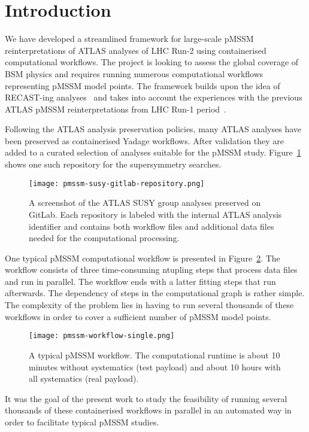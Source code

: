 \section{Introduction}\label{sec:intro}

We have developed a streamlined framework for large-scale pMSSM reinterpretations of ATLAS analyses of LHC Run-2 using containerised computational workflows.
The project is looking to assess the global coverage of BSM physics and requires running numerous computational workflows representing pMSSM model points.
The framework builds upon the idea of RECAST-ing analyses~\cite{Cranmer:2010hk} and takes into account the experiences with the previous ATLAS pMSSM reinterpretations from LHC Run-1 period~\cite{ATLAS:2015wrn}.

Following the ATLAS analysis preservation policies, many ATLAS analyses have been preserved as containerised Yadage workflows.
After validation they are added to a curated selection of analyses suitable for the pMSSM study.
Figure~\ref{fig:pmssmgitlab} shows one such repository for the supersymmetry searches.

\begin{figure}
\centering
\texttt{[image: pmssm-susy-gitlab-repository.png]}
\caption{A screenshot of the ATLAS SUSY group analyses preserved on GitLab. Each repository is labeled with the internal ATLAS analysis identifier and contains both workflow files and additional data files needed for the computational processing.}
\label{fig:pmssmgitlab}
\end{figure}

One typical pMSSM computational workflow is presented in Figure~\ref{fig:dag}.
The workflow consists of three time-consuming ntupling steps that process data files and run in parallel.
The workflow ends with a latter fitting steps that run afterwards.
The dependency of steps in the computational graph is rather simple.
The complexity of the problem lies in having to run several thousands of these workflows in order to cover a sufficient number of pMSSM model points.

\begin{figure}
\centering
\texttt{[image: pmssm-workflow-single.png]}
\caption{A typical pMSSM workflow. The computational runtime is about 10 minutes without systematics (test payload) and about 10 hours with all systematics (real payload).}
\label{fig:dag}
\end{figure}

It was the goal of the present work to study the feasibility of running several thousands of these containerised workflows in parallel in an automated way in order to facilitate typical pMSSM studies.
